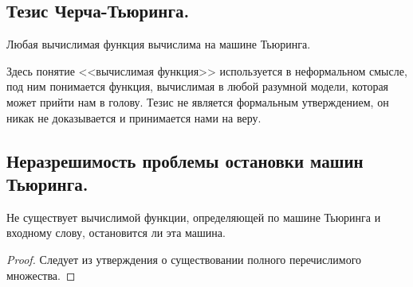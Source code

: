 \subsection{Тезис Черча-Тьюринга.}

\begin{statement}
  Любая вычислимая функция вычислима на машине Тьюринга.
\end{statement}
 Здесь понятие <<вычислимая функция>> используется в неформальном смысле, под ним понимается функция, вычислимая в любой разумной модели, которая может прийти нам в голову. Тезис не является формальным утверждением, он никак не доказывается и принимается нами на веру.

\subsection{Неразрешимость проблемы остановки машин Тьюринга.}

\begin{statement}
  Не существует вычислимой функции, определяющей по машине Тьюринга и входному слову, остановится ли эта машина.
  \begin{proof}
    Следует из утверждения о существовании полного перечислимого множества.
  \end{proof}
\end{statement}